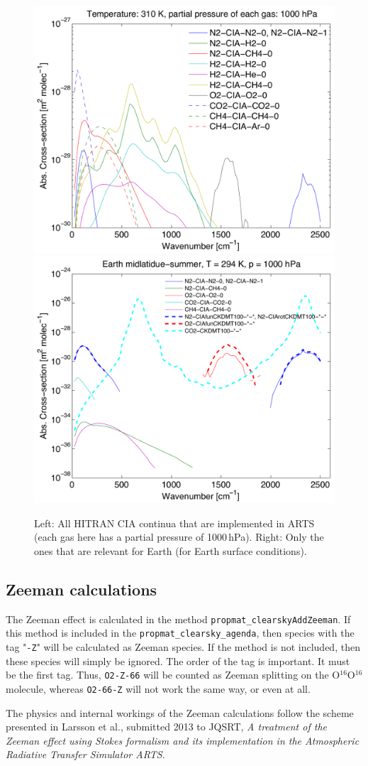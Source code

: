 \begin{figure}
 \begin{center}
  \includegraphics[width=.46\hsize]{plot_all_arts_cia_generic_1}
  \hspace{\fill}
  \includegraphics[width=.46\hsize]{plot_earth_continua_1_1}
  \caption{Left: All HITRAN CIA continua that are implemented in ARTS
    (each gas here has a partial pressure of 1000\,hPa). Right: Only
    the ones that are relevant for Earth (for Earth surface
    conditions).}
  \label{fig:absorption:cia}
 \end{center}
\end{figure}

\subsection{Zeeman calculations}
\label{sec:absorption:zeeman}

The Zeeman effect is calculated in the method \verb|propmat_clearskyAddZeeman|.
If this method is included in the \verb|propmat_clearsky_agenda|, then species with the
tag "\verb|-Z|" will be calculated as Zeeman species. If the method is not included,
then these species will simply be ignored. The order of the tag is important. 
It must be the first tag. Thus, \verb|O2-Z-66| will be counted as Zeeman splitting on the
O$^{16}$O$^{16}$ molecule, whereas \verb|O2-66-Z| will not work the same way, or even at all.

The physics and internal workings of the Zeeman calculations follow the scheme presented in
Larsson et al., submitted 2013 to JQSRT, \textit{A treatment of the Zeeman effect using Stokes
formalism and its implementation in the Atmospheric
Radiative Transfer Simulator ARTS}. %

